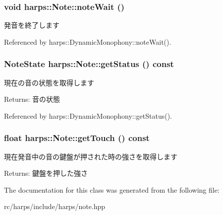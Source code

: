 \subsubsection[noteWait]{\setlength{\rightskip}{0pt plus 5cm}void harps::Note::noteWait ()\hspace{0.3cm}{\tt  [inline]}}\label{classharps_1_1Note_ae555fa8b846740ece16309eeb3aed89}


発音を終了します 

Referenced by harps::DynamicMonophony::noteWait().
\subsubsection[getStatus]{\setlength{\rightskip}{0pt plus 5cm}NoteState harps::Note::getStatus () const\hspace{0.3cm}{\tt  [inline]}}\label{classharps_1_1Note_2e242ce9707561f3ff22f9d61ecf332a}


現在の音の状態を取得します \begin{Desc}
\item[Returns:]音の状態 \end{Desc}


Referenced by harps::DynamicMonophony::getStatus().
\subsubsection[getTouch]{\setlength{\rightskip}{0pt plus 5cm}float harps::Note::getTouch () const\hspace{0.3cm}{\tt  [inline]}}\label{classharps_1_1Note_4c5924cbd850f3221114a24872be5f83}


現在発音中の音の鍵盤が押された時の強さを取得します \begin{Desc}
\item[Returns:]鍵盤を押した強さ \end{Desc}


The documentation for this class was generated from the following file:\begin{CompactItemize}
\item 
rc/harps/include/harps/note.hpp\end{CompactItemize}
